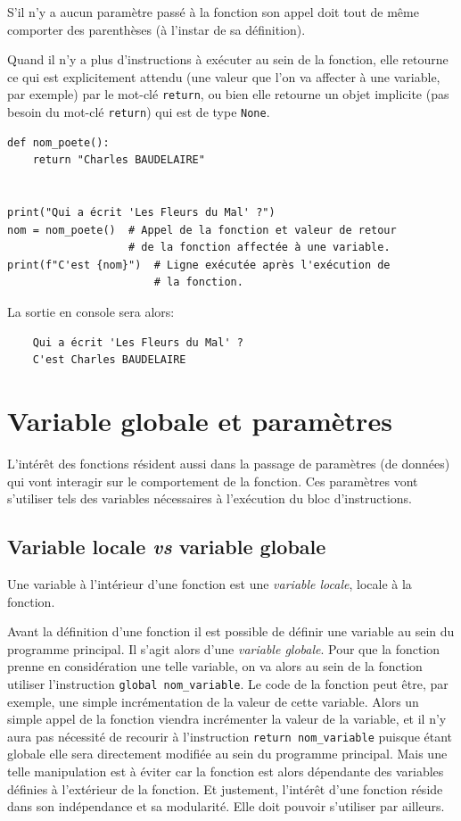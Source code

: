 \documentclass[a4paper,12pt]{book}
\begin{document}
S'il n'y a aucun paramètre passé à la fonction son appel doit tout de même comporter des parenthèses (à l'instar de sa définition).
\medskip

Quand il n'y a plus d'instructions à exécuter au sein de la fonction, elle retourne ce qui est explicitement attendu (une valeur que l'on va affecter à une variable, par exemple) par le mot-clé \texttt{return}, ou bien elle retourne un objet implicite (pas besoin du mot-clé \texttt{return}) qui est de type \texttt{None}.
\begin{lstlisting}[caption=Exemple du fonctionnement d'une fonction]
def nom_poete():
    return "Charles BAUDELAIRE"


print("Qui a écrit 'Les Fleurs du Mal' ?")
nom = nom_poete()  # Appel de la fonction et valeur de retour
                   # de la fonction affectée à une variable.
print(f"C'est {nom}")  # Ligne exécutée après l'exécution de  
                       # la fonction.
\end{lstlisting}
\medskip

La sortie en console sera alors:
\begin{verbatim}
    Qui a écrit 'Les Fleurs du Mal' ?
    C'est Charles BAUDELAIRE
\end{verbatim}
\medskip

\section{Variable globale et paramètres}
L'intérêt des fonctions résident aussi dans la passage de paramètres (de données) qui vont interagir sur le comportement de la fonction. Ces paramètres vont s'utiliser tels des variables nécessaires à l'exécution du bloc d'instructions.
\medskip

\subsection*{Variable locale \textit{vs} variable globale}
Une variable à l'intérieur d'une fonction est une \textit{variable locale}, locale à la fonction.
\medskip

Avant la définition d'une fonction il est possible de définir une variable au sein du programme principal. Il s'agit alors d'une \textit{variable globale}. Pour que la fonction prenne en considération une telle variable, on va alors au sein de la fonction utiliser l'instruction \texttt{global nom\_variable}. Le code de la fonction peut être, par exemple, une simple incrémentation de la valeur de cette variable. Alors un simple appel de la fonction viendra incrémenter la valeur de la variable, et il n'y aura pas nécessité de recourir à l'instruction \texttt{return nom\_variable} puisque étant globale elle sera directement modifiée au sein du programme principal. Mais une telle manipulation est à éviter car la fonction est alors dépendante des variables définies à l'extérieur de la fonction. Et justement, l'intérêt d'une fonction réside dans son indépendance et sa modularité. Elle doit pouvoir s'utiliser par ailleurs.
\medskip
\end{document}
